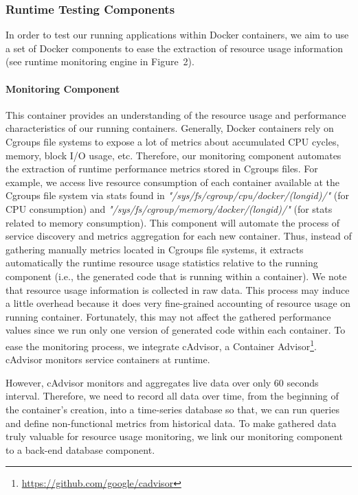 \subsubsection{Runtime Testing Components}
In order to test our running applications within Docker containers, we aim to use a set of Docker components to ease the extraction of resource usage information (see runtime monitoring engine in Figure~2).
\paragraph{Monitoring Component}
This container provides an understanding of the resource usage and performance characteristics of our running containers. Generally, Docker containers rely on Cgroups file systems to expose a lot of metrics about accumulated CPU cycles, memory, block I/O usage, etc. Therefore, our monitoring component automates the extraction of runtime performance metrics stored in Cgroups files. For example, we access live resource consumption of each container available at the Cgroups file system via stats found in \textit{"/sys/fs/cgroup/cpu/docker/(longid)/"} (for CPU consumption) and \textit{"/sys/fs/cgroup/memory/docker/(longid)/"} (for stats related to memory consumption). This component will automate the process of service discovery and metrics aggregation for each new container. Thus, instead of gathering manually metrics located in Cgroups file systems, it extracts automatically the runtime resource usage statistics relative to the running component (i.e., the generated code that is running within a container). We note that resource usage information is collected in raw data. This process may induce a little overhead because it does  very fine-grained accounting of resource usage on running container. Fortunately, this may not affect the gathered performance values since we run only one version of generated code within each container.
To ease the monitoring process, we integrate cAdvisor, a Container Advisor\footnote{\url{https://github.com/google/cadvisor}}. cAdvisor monitors service containers at runtime. 

However, cAdvisor monitors and aggregates live data over only 60 seconds interval.
Therefore, we need to record all data over time, from the beginning  of the container's creation, into a time-series database so that, we can run queries and define non-functional metrics from historical data. 
To make gathered data truly valuable for resource usage monitoring, we link our monitoring component to a back-end database component. 



